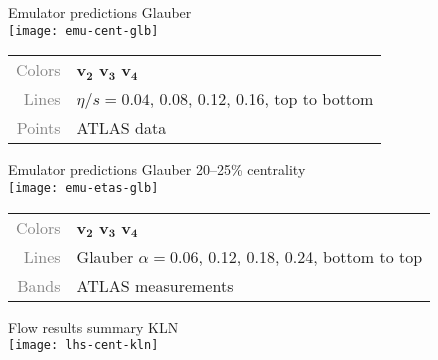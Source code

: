 \documentclass{beamer}
\begin{document}
\begin{frame}{Emulator predictions}
  \centering\vspace{1ex}
  \hspace{.5ex} Glauber \\[1ex]
  \texttt{[image: emu-cent-glb]} \\
  \small\vspace{1ex}
  \begin{tabular}{rl}
    \textcolor{grey}{Colors} &
    \textcolor{vnbl}{$\boldsymbol{v_2}$}
    \textcolor{vngr}{$\boldsymbol{v_3}$}
    \textcolor{vnor}{$\boldsymbol{v_4}$} \\
    \textcolor{grey}{Lines} & $\eta/s = 0.04$, 0.08, 0.12, 0.16, top to bottom \\
    \textcolor{grey}{Points} & ATLAS data
  \end{tabular}
\end{frame}



\begin{frame}{Emulator predictions}
  \centering\vspace{1ex}
  \hspace{2.8ex} Glauber 20--25\% centrality \\[1ex]
  \texttt{[image: emu-etas-glb]} \\
  \small\vspace{1ex}
  \begin{tabular}{rl}
    \textcolor{grey}{Colors} &
    \textcolor{vnbl}{$\boldsymbol{v_2}$}
    \textcolor{vngr}{$\boldsymbol{v_3}$}
    \textcolor{vnor}{$\boldsymbol{v_4}$} \\
    \textcolor{grey}{Lines} & Glauber $\alpha = 0.06$, 0.12, 0.18, 0.24, bottom to top \\
    \textcolor{grey}{Bands} & ATLAS measurements
  \end{tabular}
\end{frame}



\begin{frame}{Flow results summary}
  \vspace{2ex}
  \centering
  \hspace{3ex} KLN \\[.5ex]
  \texttt{[image: lhs-cent-kln]}
\end{frame}
\end{document}
